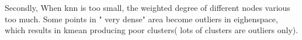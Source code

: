 \documentclass{article}
\begin{document}
Secondly, When knn is too small, the weighted degree of different nodes various too much. Some points in " very dense" area become outliers in eighenspace, which results in kmean producing poor clusters( lots of clusters are outliers only).
\begin{figure}
  \centering
  \qquad
\end{figure}
\begin{figure}
  \centering
  \qquad
  \qquad
\end{figure}
\end{document}
